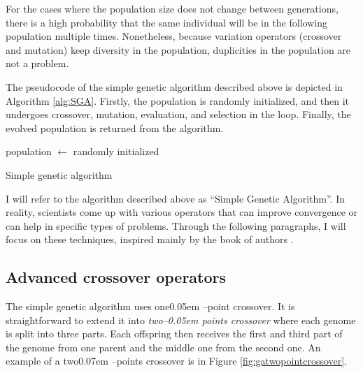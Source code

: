 For the cases where the population size does not change between generations, there is a high probability that the same individual will be in the following population multiple times. Nonetheless, because variation operators (crossover and mutation) keep diversity in the population, duplicities in the population are not a problem.

The pseudocode of the simple genetic algorithm described above is depicted in Algorithm \ref{alg:SGA}. Firstly, the population is randomly initialized, and then it undergoes crossover, mutation, evaluation, and selection in the loop. Finally, the evolved population is returned from the algorithm.

\begin{algorithm}[t]
    population $\leftarrow$ randomly initialized\;
    \caption{Simple genetic algorithm}
    \label{alg:SGA}
\end{algorithm}

I will refer to the algorithm described above as \enquote{Simple Genetic Algorithm}. In reality, scientists come up with various operators that can improve convergence or can help in specific types of problems. Through the following paragraphs, I will focus on these techniques, inspired mainly by the book of authors \citet*{IntroToGA}.

\subsection{Advanced crossover operators}

The simple genetic algorithm uses one\kern0.05em --point crossover. It is straightforward to extend it into \emph{two--\kern0.05em points crossover} where each genome is split into three parts. Each offspring then receives the first and third part of the genome from one parent and the middle one from the second one. An example of a two\kern0.07em --points crossover is in Figure \ref{fig:gatwopointcrossover}.

